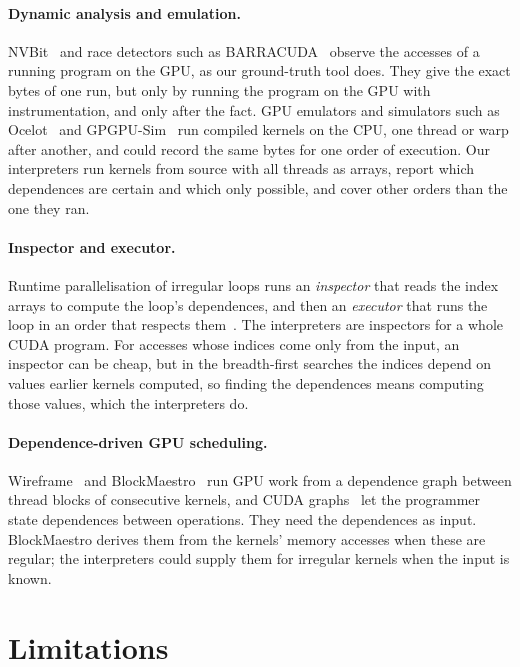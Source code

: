 \documentclass[11pt]{article}
\newcommand{\term}[1]{\emph{#1}}
\begin{document}
\paragraph{Dynamic analysis and emulation.} NVBit~\cite{Villa2019NVBit} and race detectors such as
BARRACUDA~\cite{Eizenberg2017Barracuda} observe the accesses of a running program on the GPU, as our ground-truth
tool does. They give the exact bytes of one run, but only by running the program on the GPU with instrumentation,
and only after the fact. GPU emulators and simulators such as Ocelot~\cite{Diamos2010Ocelot} and
GPGPU-Sim~\cite{Bakhoda2009GPGPUSim} run compiled kernels on the CPU, one thread or warp after another, and could
record the same bytes for one order of execution. Our interpreters run kernels from source with all threads as
arrays, report which dependences are certain and which only possible, and cover other orders than the one they
ran.

\paragraph{Inspector and executor.} Runtime parallelisation of irregular loops runs an \term{inspector} that reads
the index arrays to compute the loop's dependences, and then an \term{executor} that runs the loop in an order that
respects them~\cite{Saltz1991Inspector}. The interpreters are inspectors for a whole CUDA program. For accesses
whose indices come only from the input, an inspector can be cheap, but in the breadth-first searches the indices
depend on values earlier kernels computed, so finding the dependences means computing those values, which the
interpreters do.

\paragraph{Dependence-driven GPU scheduling.} Wireframe~\cite{Abdolrashidi2017Wireframe} and
BlockMaestro~\cite{Abdolrashidi2021BlockMaestro} run GPU work from a dependence graph between thread blocks of
consecutive kernels, and CUDA graphs~\cite{cudaguide} let the programmer state dependences between operations.
They need the dependences as input. BlockMaestro derives them from the kernels' memory accesses when these are
regular; the interpreters could supply them for irregular kernels when the input is known.

\section{Limitations}
\label{sec:limits}
\end{document}
